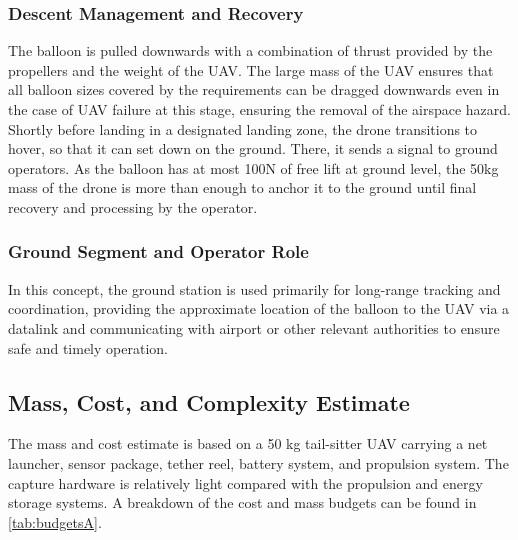 \subsubsection{Descent Management and Recovery}
The balloon is pulled downwards with a combination of thrust provided by the propellers and the weight of the UAV. The large mass of the UAV ensures that all balloon sizes covered by the requirements can be dragged downwards even in the case of UAV failure at this stage, ensuring the removal of the airspace hazard. Shortly before landing in a designated landing zone, the drone transitions to hover, so that it can set down on the ground. There, it sends a signal to ground operators. As the balloon has at most 100N of free lift at ground level, the 50kg mass of the drone is more than enough to anchor it to the ground until final recovery and processing by the operator. 

\subsubsection{Ground Segment and Operator Role}
In this concept, the ground station is used primarily for long-range tracking and coordination, providing the approximate location of the balloon to the UAV via a datalink and communicating with airport or other relevant authorities to ensure safe and timely operation.




\subsection{Mass, Cost, and Complexity Estimate}

The mass and cost estimate is based on a 50 kg tail-sitter UAV carrying a net launcher, sensor package, tether reel, battery system, and propulsion system. The capture hardware is relatively light compared with the propulsion and energy storage systems. A breakdown of the cost and mass budgets can be found in \autoref{tab:budgetsA}.

